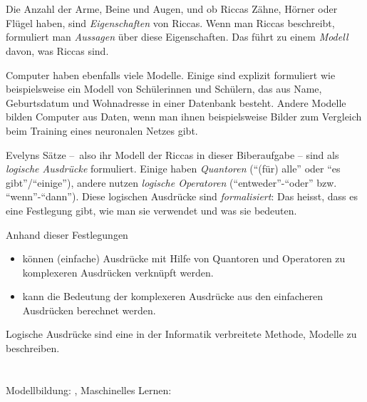 {{%
\section*{\BrochureItsInformatics}
Die Anzahl der Arme, Beine und Augen, und ob Riccas Zähne, Hörner oder Flügel haben, sind \emph{Eigenschaften} von Riccas. Wenn man Riccas beschreibt, formuliert man \emph{Aussagen} über diese Eigenschaften. Das führt zu einem \emph{Modell} davon, was Riccas sind.

Computer haben ebenfalls viele Modelle. Einige sind explizit formuliert wie beispielsweise ein Modell von Schülerinnen und Schülern, das aus Name, Geburtsdatum und Wohnadresse in einer Datenbank besteht. Andere Modelle bilden Computer aus Daten, wenn man ihnen beispielsweise Bilder zum Vergleich beim Training eines neuronalen Netzes gibt.

Evelyns Sätze –~also ihr Modell der Riccas in dieser Biberaufgabe – sind als \emph{logische Ausdrücke} formuliert. Einige haben \emph{Quantoren} (\enquote{(für) alle} oder \enquote{es gibt}/\enquote{einige}), andere nutzen \emph{logische Operatoren} (\enquote{entweder}-\enquote{oder} bzw. \enquote{wenn}-\enquote{dann}). Diese logischen Ausdrücke sind \emph{formalisiert}: Das heisst, dass es eine Festlegung gibt, wie man sie verwendet und was sie bedeuten.

\begin{samepage}
Anhand dieser Festlegungen

\nopagebreak

\begin{itemize}
  \item können (einfache) Ausdrücke mit Hilfe von Quantoren und Operatoren zu komplexeren Ausdrücken verknüpft werden.
  \item kann die Bedeutung der komplexeren Ausdrücke aus den einfacheren Ausdrücken berechnet werden.
\end{itemize}


\end{samepage}

Logische Ausdrücke sind eine in der Informatik verbreitete Methode, Modelle zu beschreiben.



\section*{\BrochureWebsitesAndKeywords}
{\raggedright
Modellbildung: \href{https://de.wikipedia.org/wiki/Modell\#Modellbildung}{}, \href{https://de.wikipedia.org/wiki/Objektorientierte_Analyse_und_Design}{}
Maschinelles Lernen: \href{https://de.wikipedia.org/wiki/Maschinelles_Lernen}{}


}}}
